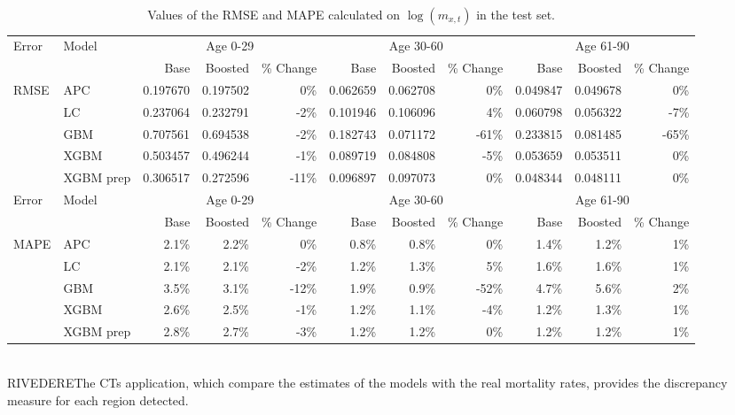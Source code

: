 \documentclass[fleqn,10pt]{wlscirep}
\begin{document}
\begin{table}[ht]
\centering
\footnotesize
\begin{tabular}{|l|l|r|r|r|r|r|r|r|r|r|}
\hline
\multirow{2}{*}{Error} & \multirow{2}{*}{Model} & \multicolumn{3}{c|}{Age 0-29} & \multicolumn{3}{c|}{Age 30-60} & \multicolumn{3}{c|}{Age 61-90} \\
\cline{3-11}
&			&	Base 	&	Boosted 	& \% Change &	Base 	&	Boosted 	& \% Change &	Base 	&	Boosted	& \% Change\\
\hline
\multirow{5}{*}{RMSE}  & APC 		&	0.197670	&	0.197502	&	0\%		&	0.062659	&	0.062708	&	0\%	&	0.049847	&	0.049678	&	0\%	\\
& LC 		&	0.237064	&	0.232791	&	-2\%		&	0.101946	&	0.106096	&	4\%	&	0.060798	&	0.056322	&	-7\%	\\
& GBM 		&	0.707561	&	0.694538	&	-2\%		&	0.182743	&	0.071172	&	-61\%	&	0.233815	&	0.081485	&	-65\%	\\
& XGBM 		&	0.503457	&	0.496244	&	-1\%		&	0.089719	&	0.084808	&	-5\%	&	0.053659	&	0.053511	&	0\%	\\
& XGBM prep 	&	0.306517	&	0.272596	&	-11\%	&	0.096897	&	0.097073	&	0\%	&	0.048344	&	0.048111	&	0\%	\\
\hline
\multirow{2}{*}{Error} & \multirow{2}{*}{Model} & \multicolumn{3}{c|}{Age 0-29} & \multicolumn{3}{c|}{Age 30-60} & \multicolumn{3}{c|}{Age 61-90} \\
\cline{3-11}
&			&	Base 	&	Boosted 	& \% Change &	Base 	&	Boosted 	& \% Change &	Base 	&	Boosted	& \% Change\\
\hline
\multirow{5}{*}{MAPE}  & APC 	&	2.1\%	&	2.2\%	&	0\%		&	0.8\%	&	0.8\%	&	0\%		&	1.4\%	&	1.2\%	&	1\%	\\
& LC 		&	2.1\%	&	2.1\%	&	-2\%		&	1.2\%	&	1.3\%	&	5\%		&	1.6\%	&	1.6\%	&	1\%	\\
& GBM 		&	3.5\%	&	3.1\%	&	-12\%	&	1.9\%	&	0.9\%	&	-52\%	&	4.7\%	&	5.6\%	&	2\%	\\
& XGBM 		&	2.6\%	&	2.5\%	&	-1\%		&	1.2\%	&	1.1\%	&	-4\%		&	1.2\%	&	1.3\%	&	1\%	\\
& XGBM prep 	&	2.8\%	&	2.7\%	&	-3\%		&	1.2\%	&	1.2\%	&	0\%		&	1.2\%	&	1.2\%	&	1\%	\\\hline
\end{tabular}
\caption{Values of the RMSE and MAPE calculated on $\log{\left(m_{x,t}\right)}$ in the test set.}
\label{tab:errors_log}
\end{table}\\
%
\color{red} RIVEDEREThe CTs application, which compare the estimates of the models with the real mortality rates, provides the discrepancy measure for each region detected. 
\end{document}
